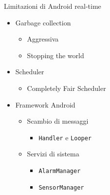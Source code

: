 \begin{frame}{Limitazioni di Android real-time}
	\begin{itemize}
		\item Garbage collection
		\begin{itemize}
			\item Aggressiva
			\item Stopping the world
		\end{itemize}
		\item Scheduler
		\begin{itemize}
			\item Completely Fair Scheduler
		\end{itemize}
		\item Framework Android
		\begin{itemize}
			\item Scambio di messaggi
			\begin{itemize}
				\item \texttt{Handler} e \texttt{Looper}
			\end{itemize}
			\item Servizi di sistema
			\begin{itemize}
				\item \texttt{AlarmManager}
				\item \texttt{SensorManager}
			\end{itemize}
		\end{itemize}
	\end{itemize}
\end{frame}